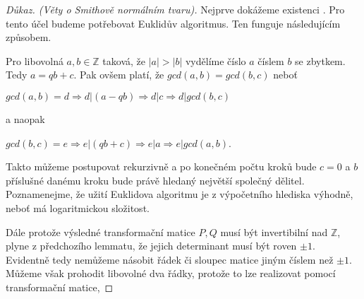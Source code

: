 \begin{proof}[Důkaz. (Věty o Smithově normálním tvaru)]
Nejprve dokážeme existenci \snf. Pro tento účel budeme potřebovat Euklidův
algoritmus. Ten funguje následujícím způsobem.

Pro libovolná $ a, b \in \mathbb{Z}$ taková, že $ |a| > |b| $ vydělíme číslo
$ a $ číslem $ b $ se zbytkem. Tedy $ a = qb + c $. Pak ovšem platí, že
$ gcd(a, b) = gcd(b, c) $ neboť

\begin{center}
$ gcd(a, b) = d \Rightarrow d \vert (a - qb) \Rightarrow d \vert c \Rightarrow d \vert gcd(b, c)$
\end{center}
a naopak
\begin{center}
$ gcd(b, c) = e \Rightarrow e \vert (qb + c) \Rightarrow e \vert a \Rightarrow e \vert gcd(a, b)$.
\end{center}
Takto můžeme postupovat rekurzivně a po konečném počtu kroků bude $ c = 0 $ a
$ b $ příslušné danému kroku bude právě hledaný největší společný dělitel.
Poznamenejme, že užití Euklidova algoritmu je z výpočetního hlediska výhodně, neboť
má logaritmickou složitost.

Dále protože výsledné transformační matice $ P, Q $ musí být invertibilní nad $\mathbb{Z}$,
plyne z předchozího lemmatu, že jejich determinant musí být roven $ \pm 1 $.
Evidentně tedy nemůžeme násobit řádek či sloupec matice jiným číslem než  $ \pm 1 $.
Můžeme však prohodit libovolné dva řádky, protože to lze realizovat pomocí
transformační matice,


\end{proof}
